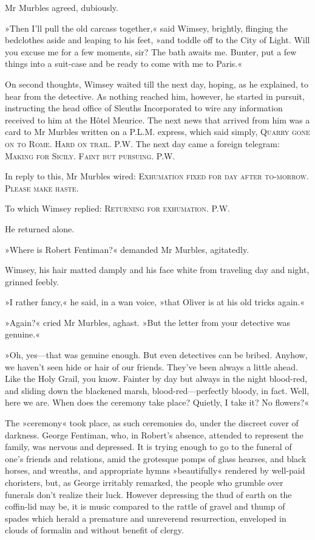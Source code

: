 Mr Murbles agreed, dubiously.

»Then I'll pull the old carcass together,« said Wimsey, brightly, flinging the bedclothes aside and leaping to his feet, »and toddle off to the City of Light. Will you excuse me for a few moments, sir? The bath awaits me. Bunter, put a few things into a suit-case and be ready to come with me to Paris.«

On second thoughts, Wimsey waited till the next day, hoping, as he explained, to hear from the detective. As nothing reached him, however, he started in pursuit, instructing the head office of Sleuths Incorporated to wire any information received to him at the Hôtel Meurice. The next news that arrived from him was a card to Mr Murbles written on a P.L.M. express, which said simply, \textsc{Quarry gone on to Rome. Hard on trail. P.W.} The next day came a foreign telegram: \textsc{Making for Sicily. Faint but pursuing. P.W.}

In reply to this, Mr Murbles wired: \textsc{Exhumation fixed for day after to-morrow. Please make haste.}

To which Wimsey replied: \textsc{Returning for exhumation. P.W.}

He returned alone.

»Where is Robert Fentiman?« demanded Mr Murbles, agitatedly.

Wimsey, his hair matted damply and his face white from traveling day and night, grinned feebly.

»I rather fancy,« he said, in a wan voice, »that Oliver is at his old tricks again.«

»Again?« cried Mr Murbles, aghast. »But the letter from your detective was genuine.«

»Oh, yes\allowbreak---\allowbreak that was genuine enough. But even detectives can be bribed. Anyhow, we haven't seen hide or hair of our friends. They've been always a little ahead. Like the Holy Grail, you know. Fainter by day but always in the night blood-red, and sliding down the blackened marsh, blood-red\allowbreak---\allowbreak perfectly bloody, in fact. Well, here we are. When does the ceremony take place? Quietly, I take it? No flowers?«

The »ceremony« took place, as such ceremonies do, under the discreet cover of darkness. George Fentiman, who, in Robert's absence, attended to represent the family, was nervous and depressed. It is trying enough to go to the funeral of one's friends and relations, amid the grotesque pomps of glass hearses, and black horses, and wreaths, and appropriate hymns »beautifully« rendered by well-paid choristers, but, as George irritably remarked, the people who grumble over funerals don't realize their luck. However depressing the thud of earth on the coffin-lid may be, it is music compared to the rattle of gravel and thump of spades which herald a premature and unreverend resurrection, enveloped in clouds of formalin and without benefit of clergy.

